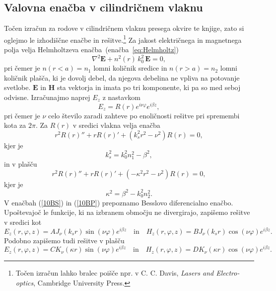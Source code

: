 \subsection*{Valovna enačba v cilindričnem vlaknu}
Točen izračun za rodove v cilindričnem vlaknu presega okvire te knjige, zato
si oglejmo le izhodiščne enačbe in rešitve.\footnote{Točen izračun lahko bralec poišče npr. v C. C. Davis, 
{\it Lasers and Electro-optics}, Cambridge University Press.} Za jakost električnega in magnetnega polja velja 
Helmholtzeva enačba~(enačba~\ref{eq:Helmholtz})
\begin{equation}
\nabla^2 \mathbf{E} + n^2(r)\, k_0^2\, \mathbf{E} = 0,
\end{equation}
pri čemer je $n(r<a)=n_1$ lomni količnik sredice in $n(r>a)=n_2$ 
lomni količnik plašča, ki je dovolj debel, da njegova debelina ne 
vpliva na potovanje svetlobe. $\mathbf{E}$ in $\mathbf{H}$ sta vektorja in imata po 
tri komponente, ki pa so med seboj odvisne. Izračunajmo naprej $E_z$ z nastavkom
\begin{equation}
E_z = R(r)e^{i \nu \varphi}e^{i \beta z},
\end{equation}
pri čemer je $\nu$ celo število zaradi zahteve po enoličnosti rešitve pri spremembi
kota za $2\pi$. Za $R(r)$ v sredici vlakna velja enačba
\begin{equation}
r^2 R(r)'' + r R(r)' + (k_s^2r^2 - \nu^2)R(r) = 0,
\label{10BS}
\end{equation}
kjer je 
\begin{equation}
k_s^2=k_0^2n_1^2- \beta^2,
\label{eq:ks}
\end{equation}
in v plašču
\begin{equation}
r^2 R(r)'' + r R(r)' + (-\kappa^2r^2 - \nu^2)R(r) = 0,
\label{10BP}
\end{equation}
kjer je 
\begin{equation}
\kappa^2=\beta^2-k_0^2n_2^2.
\end{equation}
V enačbah (\ref{10BS}) in (\ref{10BP}) prepoznamo Besslovo diferencialno enačbo. 
Upoštevajoč le funkcije, ki na izbranem območju ne divergirajo, zapišemo rešitve v sredici kot
\begin{equation}
E_z (r, \varphi, z) = A J_\nu(k_sr)\sin(\nu \varphi)e^{i \beta z} \quad  \mathrm{in} \quad 
H_z (r, \varphi, z) = B J_\nu(k_sr)\cos(\nu \varphi)e^{i \beta z}.
\end{equation}
Podobno zapišemo tudi rešitve v plašču
\begin{equation}
E_z (r, \varphi, z)= C K_\nu(\kappa r)\sin(\nu \varphi)e^{i \beta z} \quad \mathrm{in} \quad 
H_z (r, \varphi, z)= D K_\nu(\kappa r)\cos(\nu \varphi)e^{i \beta z}.
\end{equation}
